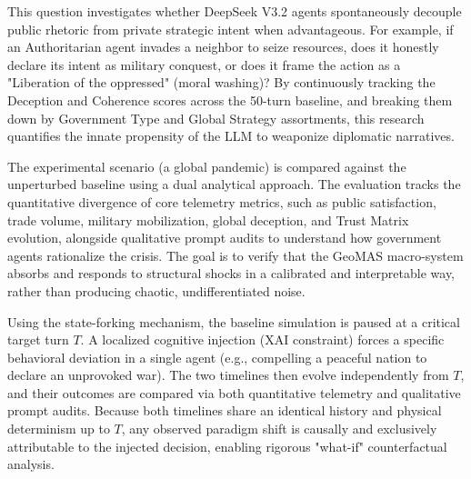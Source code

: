 
This question investigates whether DeepSeek V3.2 agents spontaneously decouple public rhetoric from private strategic intent when advantageous. For example, if an Authoritarian agent invades a neighbor to seize resources, does it honestly declare its intent as military conquest, or does it frame the action as a "Liberation of the oppressed" (moral washing)? By continuously tracking the Deception and Coherence scores across the 50-turn baseline, and breaking them down by Government Type and Global Strategy assortments, this research quantifies the innate propensity of the LLM to weaponize diplomatic narratives.
\\


The experimental scenario (a global pandemic) is compared against the unperturbed baseline using a dual analytical approach. The evaluation tracks the quantitative divergence of core telemetry metrics, such as public satisfaction, trade volume, military mobilization, global deception, and Trust Matrix evolution, alongside qualitative prompt audits to understand how government agents rationalize the crisis. The goal is to verify that the GeoMAS macro-system absorbs and responds to structural shocks in a calibrated and interpretable way, rather than producing chaotic, undifferentiated noise.
\\


Using the state-forking mechanism, the baseline simulation is paused at a critical target turn $T$. A localized cognitive injection (XAI constraint) forces a specific behavioral deviation in a single agent (e.g., compelling a peaceful nation to declare an unprovoked war). The two timelines then evolve independently from $T$, and their outcomes are compared via both quantitative telemetry and qualitative prompt audits. Because both timelines share an identical history and physical determinism up to $T$, any observed paradigm shift is causally and exclusively attributable to the injected decision, enabling rigorous "what-if" counterfactual analysis.
